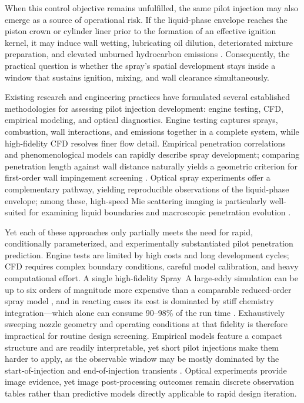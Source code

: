 When this control objective remains unfulfilled, the same pilot injection may also emerge as a source of operational risk.
If the liquid-phase envelope reaches the piston crown or cylinder liner prior to the formation of an effective ignition kernel, it may induce wall wetting, lubricating oil dilution, deteriorated mixture preparation, and elevated unburned hydrocarbon emissions
\cite{peraza2022swi,ahmad2025fueldilution,MorieiraMotaPanao2010}.
Consequently, the practical question is whether the spray's spatial development stays inside a window that sustains ignition, mixing, and wall clearance simultaneously.

Existing research and engineering practices have formulated several established methodologies for assessing pilot injection development: engine testing, CFD, empirical modeling, and optical diagnostics.
Engine testing captures sprays, combustion, wall interactions, and emissions together in a complete system, while high-fidelity CFD resolves finer flow detail.
Empirical penetration correlations and phenomenological models can rapidly describe spray development; comparing penetration length against wall distance naturally yields a geometric criterion for first-order wall impingement screening
\cite{HiroyasuArai1990,NaberSiebers1996,Baumgarten2006MixFormation}.
Optical spray experiments offer a complementary pathway, yielding reproducible observations of the liquid-phase envelope; among these, high-speed Mie scattering imaging is particularly well-suited for examining liquid boundaries and macroscopic penetration evolution
\cite{Linne2013SprayImaging}.

Yet each of these approaches only partially meets the need for rapid, conditionally parameterized, and experimentally substantiated pilot penetration prediction.
Engine tests are limited by high costs and long development cycles; CFD requires complex boundary conditions, careful model calibration, and heavy computational effort. A single high-fidelity Spray~A large-eddy simulation can be up to six orders of magnitude more expensive than a comparable reduced-order spray model \cite{Deshmukh2021CAS}, and in reacting cases its cost is dominated by stiff chemistry integration---which alone can consume 90--98\% of the run time \cite{Tekgul2021DLBFoam,CurtisNiemeyerSung2017}. Exhaustively sweeping nozzle geometry and operating conditions at that fidelity is therefore impractical for routine design screening.
Empirical models feature a compact structure and are readily interpretable, yet short pilot injections make them harder to apply, as the observable window may be mostly dominated by the start-of-injection and end-of-injection transients
\cite{ZhouLiYi2021,ZhouLiLaiWei2019}.
Optical experiments provide image evidence, yet image post-processing outcomes remain discrete observation tables rather than predictive models directly applicable to rapid design iteration.

